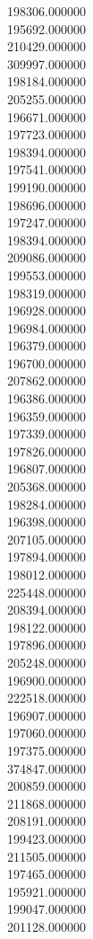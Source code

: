 198306.000000\\
195692.000000\\
210429.000000\\
309997.000000\\
198184.000000\\
205255.000000\\
196671.000000\\
197723.000000\\
198394.000000\\
197541.000000\\
199190.000000\\
198696.000000\\
197247.000000\\
198394.000000\\
209086.000000\\
199553.000000\\
198319.000000\\
196928.000000\\
196984.000000\\
196379.000000\\
196700.000000\\
207862.000000\\
196386.000000\\
196359.000000\\
197339.000000\\
197826.000000\\
196807.000000\\
205368.000000\\
198284.000000\\
196398.000000\\
207105.000000\\
197894.000000\\
198012.000000\\
225448.000000\\
208394.000000\\
198122.000000\\
197896.000000\\
205248.000000\\
196900.000000\\
222518.000000\\
196907.000000\\
197060.000000\\
197375.000000\\
374847.000000\\
200859.000000\\
211868.000000\\
208191.000000\\
199423.000000\\
211505.000000\\
197465.000000\\
195921.000000\\
199047.000000\\
201128.000000\\
